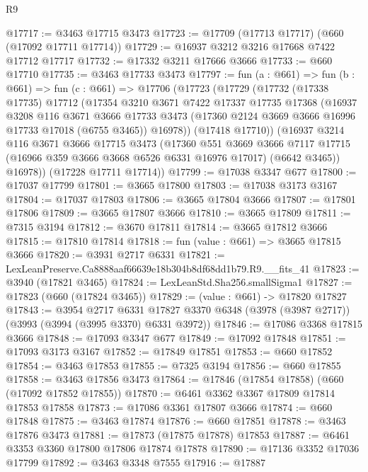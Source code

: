 \begin{lexlean}{R9}
\begin{coremodule}
@17717 := @3463 @17715 @3473
@17723 := @17709 (@17713 @17717) (@660 (@17092 @17711 @17714))
@17729 := @16937 @3212 @3216 @17668 @7422 @17712 @17717
@17732 := @17332 @3211 @17666 @3666
@17733 := @660 @17710
@17735 := @3463 @17733 @3473
@17797 := fun (a : @661) =>
  fun (b : @661) =>
  fun (c : @661) =>
  @17706
    (@17723
      (@17729
        (@17732
          (@17338 @17735)
          @17712
          (@17354
            @3210
            @3671
            @7422
            @17337
            @17735
            @17368
            (@16937
              @3208
              @116
              @3671
              @3666
              @17733
              @3473
              (@17360 @2124 @3669 @3666 @16996 @17733 @17018 (@6755 @3465))
              @16978))
          (@17418 @17710))
        (@16937
          @3214
          @116
          @3671
          @3666
          @17715
          @3473
          (@17360
            @551
            @3669
            @3666
            @7117
            @17715
            (@16966 @359 @3666 @3668 @6526 @6331 @16976 @17017)
            (@6642 @3465))
          @16978))
      (@17228 @17711 @17714))
@17799 := @17038 @3347 @677
@17800 := @17037 @17799
@17801 := @3665 @17800
@17803 := @17038 @3173 @3167
@17804 := @17037 @17803
@17806 := @3665 @17804 @3666
@17807 := @17801 @17806
@17809 := @3665 @17807 @3666
@17810 := @3665 @17809
@17811 := @7315 @3194
@17812 := @3670 @17811
@17814 := @3665 @17812 @3666
@17815 := @17810 @17814
@17818 := fun (value : @661) => @3665 @17815 @3666
@17820 := @3931 @2717 @6331
@17821 := LexLeanPreserve.Ca8888aaf66639e18b304b8df68dd1b79.R9.__fits_41
@17823 := @3940 (@17821 @3465)
@17824 := LexLeanStd.Sha256.smallSigma1
@17827 := @17823 (@660 (@17824 @3465))
@17829 := (value : @661) -> @17820 @17827
@17843 := @3954
    @2717
    @6331
    @17827
    @3370
    @6348
    (@3978 (@3987 @2717))
    (@3993 (@3994 (@3995 @3370) @6331 @3972))
@17846 := @17086 @3368 @17815 @3666
@17848 := @17093 @3347 @677
@17849 := @17092 @17848
@17851 := @17093 @3173 @3167
@17852 := @17849 @17851
@17853 := @660 @17852
@17854 := @3463 @17853
@17855 := @7325 @3194
@17856 := @660 @17855
@17858 := @3463 @17856 @3473
@17864 := @17846 (@17854 @17858) (@660 (@17092 @17852 @17855))
@17870 := @6461 @3362 @3367 @17809 @17814 @17853 @17858
@17873 := @17086 @3361 @17807 @3666
@17874 := @660 @17848
@17875 := @3463 @17874
@17876 := @660 @17851
@17878 := @3463 @17876 @3473
@17881 := @17873 (@17875 @17878) @17853
@17887 := @6461 @3353 @3360 @17800 @17806 @17874 @17878
@17890 := @17136 @3352 @17036 @17799
@17892 := @3463 @3348 @7555
@17916 := @17887

\end{coremodule}
\end{lexlean}
